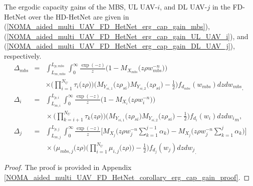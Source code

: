 \begin{corollary} \label{NOMA_aided_multi_UAV_FD_HetNet_corollary_erg_cap_gain}
The ergodic capacity gains of the MBS, UL UAV-$i$, and DL UAV-$j$ in the FD-HetNet over the HD-HetNet are given in (\ref{NOMA_aided_multi_UAV_FD_HetNet_erg_cap_gain_mbs}), (\ref{NOMA_aided_multi_UAV_FD_HetNet_erg_cap_gain_UL_UAV_i}), and (\ref{NOMA_aided_multi_UAV_FD_HetNet_erg_cap_gain_DL_UAV_j}), respectively.
\begin{eqnarray} 
\Delta_{mbs} & = & \int_{L_{m,mbs}}^{L_{p,mbs}} \int_{0}^{\infty} \frac{\exp(-z)}{z} \Bigg(1-M_{X_{mbs}}\Big(z\rho  w_{mbs}^{-n}\Big)\Bigg) \nonumber \\
 & & \times \Bigg( \prod_{i=1}^{N_U} \tau_i\big(z\rho\big) \Bigg) \Bigg(M_{Y_{si,1}}\big(z\rho_{si}\big) M_{Y_{si,2}}\big(z\rho_{si} \big) - \frac{1}{2} \Bigg) f_{d_{mbs}}(w_{mbs}) {dz dw_{mbs}}_, \label{NOMA_aided_multi_UAV_FD_HetNet_erg_cap_gain_mbs} \\
\Delta_{i} & = & \int_{L_{m,i}}^{L_{p,i}} \int_{0}^{\infty} \frac{\exp(-z)}{z} \Bigg(1-M_{X_{i}}\Big(z\rho  w_{i}^{-n}\Big)\Bigg) \nonumber \\
 & & \hspace{0cm} \times \Bigg( \prod_{k=i+1}^{N_U} \tau_k\big(z\rho\big) \Bigg) \Bigg( M_{Y_{si,1}}\big(z\rho_{si}\big) M_{Y_{si,2}}\big(z\rho_{si}\big) - \frac{1}{2} \Bigg) f_{d_{i}}(w_{i}) {dz dw_{i}}_m, \label{NOMA_aided_multi_UAV_FD_HetNet_erg_cap_gain_UL_UAV_i} \\
\Delta_{j} & = & \int_{L_{m,j}}^{L_{p,j}} \int_{0}^{\infty} \frac{\exp(-z)}{z} \Bigg[M_{X_j}\Bigg(z \rho w_j^{-n} \sum_{k=1}^{j-1}\alpha_k \Bigg) - M_{X_j}\Bigg(z \rho w_j^{-n} \sum_{k=1}^{j}\alpha_k\Bigg)\Bigg]  \nonumber \\
 & & \hspace{0cm} \times \Bigg( \mu_{mbs,j}\big(z\rho\big) \Bigg( \prod_{i=1}^{N_U} \mu_{i,j}\big(z\rho\big) \Bigg) - \frac{1}{2} \Bigg) f_{d_{j}}(w_j) dz {dw_j}_. \label{NOMA_aided_multi_UAV_FD_HetNet_erg_cap_gain_DL_UAV_j}
\end{eqnarray}
\end{corollary}
\begin{proof}
The proof is provided in Appendix \ref{NOMA_aided_multi_UAV_FD_HetNet_corollary_erg_cap_gain_proof}.
\end{proof}


